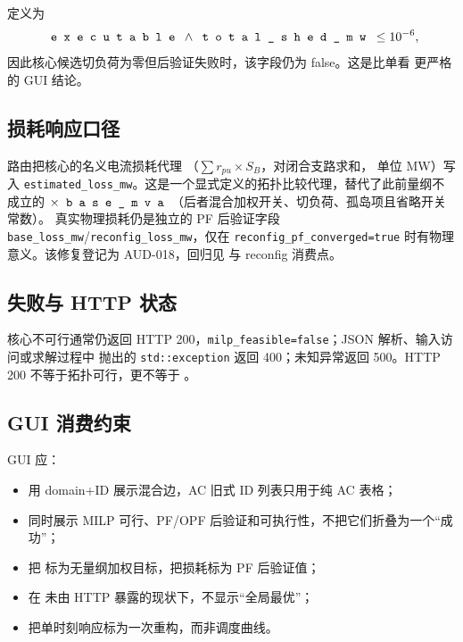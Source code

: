  定义为
\begin{equation}
\fld{executable}\land \fld{total\_shed\_mw}\le10^{-6},
\end{equation}
因此核心候选切负荷为零但后验证失败时，该字段仍为 false。这是比单看
 更严格的 GUI 结论。

\subsection{损耗响应口径}

路由把核心的名义电流损耗代理 （$\sum r_{pu}\times S_B$，对闭合支路求和，
单位 MW）写入 \texttt{estimated\_loss\_mw}。这是一个显式定义的拓扑比较代理，替代了此前量纲不成立的
$\times\fld{base\_mva}$（后者混合加权开关、切负荷、孤岛项且省略开关常数）。
真实物理损耗仍是独立的 PF 后验证字段 \texttt{base\_loss\_mw}/\texttt{reconfig\_loss\_mw}，仅在
\texttt{reconfig\_pf\_converged=true} 时有物理意义。该修复登记为 AUD-018，回归见
 与 reconfig 消费点。

\subsection{失败与 HTTP 状态}

核心不可行通常仍返回 HTTP 200，\texttt{milp\_feasible=false}；JSON 解析、输入访问或求解过程中
抛出的 \texttt{std::exception} 返回 400；未知异常返回 500。HTTP 200 不等于拓扑可行，更不等于
。

\subsection{GUI 消费约束}

GUI 应：
\begin{itemize}
  \item 用 domain+ID 展示混合边，AC 旧式 ID 列表只用于纯 AC 表格；
  \item 同时展示 MILP 可行、PF/OPF 后验证和可执行性，不把它们折叠为一个“成功”；
  \item 把  标为无量纲加权目标，把损耗标为 PF 后验证值；
  \item 在  未由 HTTP 暴露的现状下，不显示“全局最优”；
  \item 把单时刻响应标为一次重构，而非调度曲线。
\end{itemize}
